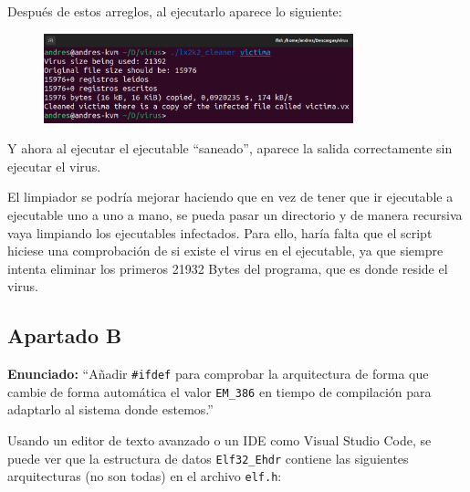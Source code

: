\documentclass{article}
\begin{document}
\newpage

Después de estos arreglos, al ejecutarlo aparece lo siguiente:

\begin{figure}[H]
    \centering
    \includegraphics[width=0.8\textwidth]{imagenes/Captura desde 2022-11-23 12-45-50.png}
\end{figure}

\bigskip

Y ahora al ejecutar el ejecutable ``saneado'', aparece la salida correctamente sin ejecutar el virus.

\bigskip

El limpiador se podría mejorar haciendo que en vez de tener que ir ejecutable a ejecutable uno a uno a mano, se pueda pasar un directorio y de manera recursiva vaya limpiando los ejecutables infectados. Para ello, haría falta que el script hiciese una comprobación de si existe el virus en el ejecutable, ya que siempre intenta eliminar los primeros 21932 Bytes del programa, que es donde reside el virus.

{}
\subsection*{Apartado B}

\textbf{Enunciado: }``Añadir \verb|#ifdef| para comprobar la arquitectura de forma que cambie de forma automática el valor \verb|EM_386| en tiempo de compilación para adaptarlo al sistema donde estemos.''

\bigskip

Usando un editor de texto avanzado o un IDE como Visual Studio Code, se puede ver que la estructura de datos \verb|Elf32_Ehdr| contiene las siguientes arquitecturas (no son todas) en el archivo \verb|elf.h|:
\end{document}
